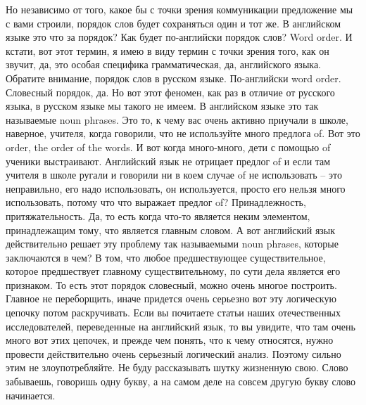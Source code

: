 \documentclass[main.tex]{subfiles}
\begin{document}
\newpage
{}

Но независимо от того, какое бы с точки зрения коммуникации предложение мы с вами строили, порядок слов будет сохраняться один и тот же.
В английском языке это что за порядок?
Как будет по-английски порядок слов?
Word order.
И кстати, вот этот термин, я имею в виду термин с точки зрения того, как он звучит, да, это особая специфика грамматическая, да, английского языка.
Обратите внимание, порядок слов в русском языке.
По-английски word order.
Словесный порядок, да.
Но вот этот феномен, как раз в отличие от русского языка, в русском языке мы такого не имеем.
В английском языке это так называемые noun phrases.
Это то, к чему вас очень активно приучали в школе, наверное, учителя, когда говорили, что не используйте много предлога of.
Вот это order, the order of the words.
И вот когда много-много, дети с помощью of ученики выстраивают.
Английский язык не отрицает предлог of и если там учителя в школе ругали и говорили ни в коем случае of не использовать -- это неправильно, его надо использовать, он используется, просто его нельзя много использовать, потому что что выражает предлог of?
Принадлежность, притяжательность.
Да, то есть когда что-то является неким элементом, принадлежащим тому, что является главным словом.
А вот английский язык действительно решает эту проблему так называемыми noun phrases, которые заключаются в чем?
В том, что любое предшествующее существительное, которое предшествует главному существительному, по сути дела является его признаком.
То есть этот порядок словесный, можно очень многое построить.
Главное не переборщить, иначе придется очень серьезно вот эту логическую цепочку потом раскручивать.
Если вы почитаете статьи наших отечественных исследователей, переведенные на английский язык, то вы увидите, что там очень много вот этих цепочек, и прежде чем понять, что к чему относятся, нужно провести действительно очень серьезный логический анализ.
Поэтому сильно этим не злоупотребляйте.
Не буду рассказывать шутку жизненную свою.
Слово забываешь, говоришь одну букву, а на самом деле на совсем другую букву слово начинается.
\end{document}
